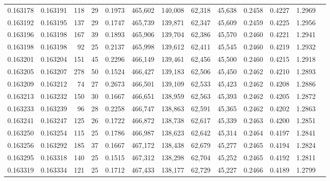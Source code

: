 \begin{tabular}{rrrrrrrrrrrrr}
0.163178 & 0.163191 &   118 &  29 &                                     0.1973 & 465,602 & 140,008 &  62,318 &  45,638 & 0.2458 & 0.4227 & 1.2969 \\
0.163192 & 0.163195 &   137 &  29 &                                     0.1747 & 465,739 & 139,871 &  62,347 &  45,609 & 0.2459 & 0.4225 & 1.2956 \\
0.163196 & 0.163198 &   167 &  39 &                                     0.1893 & 465,906 & 139,704 &  62,386 &  45,570 & 0.2460 & 0.4221 & 1.2941 \\
0.163198 & 0.163198 &    92 &  25 &                                     0.2137 & 465,998 & 139,612 &  62,411 &  45,545 & 0.2460 & 0.4219 & 1.2932 \\
0.163201 & 0.163204 &   151 &  45 &                                     0.2296 & 466,149 & 139,461 &  62,456 &  45,500 & 0.2460 & 0.4215 & 1.2918 \\
0.163205 & 0.163207 &   278 &  50 &                                     0.1524 & 466,427 & 139,183 &  62,506 &  45,450 & 0.2462 & 0.4210 & 1.2893 \\
0.163209 & 0.163212 &    74 &  27 &                                     0.2673 & 466,501 & 139,109 &  62,533 &  45,423 & 0.2462 & 0.4208 & 1.2886 \\
0.163213 & 0.163232 &   150 &  30 &                                     0.1667 & 466,651 & 138,959 &  62,563 &  45,393 & 0.2462 & 0.4205 & 1.2872 \\
0.163233 & 0.163239 &    96 &  28 &                                     0.2258 & 466,747 & 138,863 &  62,591 &  45,365 & 0.2462 & 0.4202 & 1.2863 \\
0.163241 & 0.163247 &   125 &  26 &                                     0.1722 & 466,872 & 138,738 &  62,617 &  45,339 & 0.2463 & 0.4200 & 1.2851 \\
0.163250 & 0.163254 &   115 &  25 &                                     0.1786 & 466,987 & 138,623 &  62,642 &  45,314 & 0.2464 & 0.4197 & 1.2841 \\
0.163256 & 0.163292 &   185 &  37 &                                     0.1667 & 467,172 & 138,438 &  62,679 &  45,277 & 0.2465 & 0.4194 & 1.2824 \\
0.163295 & 0.163318 &   140 &  25 &                                     0.1515 & 467,312 & 138,298 &  62,704 &  45,252 & 0.2465 & 0.4192 & 1.2811 \\
0.163319 & 0.163334 &   121 &  25 &                                     0.1712 & 467,433 & 138,177 &  62,729 &  45,227 & 0.2466 & 0.4189 & 1.2799 \\

\end{tabular}
